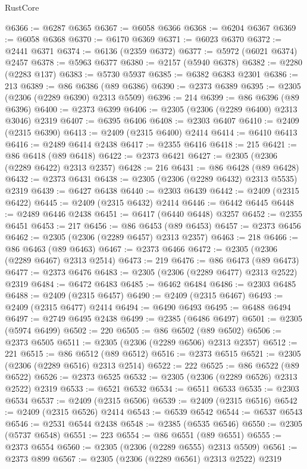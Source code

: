 \begin{lexlean}{RustCore}
\begin{coremodule}
@6366 := @6287 @6365
@6367 := @6058 @6366
@6368 := @6204 @6367
@6369 := @6058 @6368
@6370 := @6170 @6369
@6371 := @6023 @6370
@6372 := @2441 @6371
@6374 := @6136 (@2359 @6372)
@6377 := @5972 (@6021 @6374) @2457
@6378 := @5963 @6377
@6380 := @2157 (@5940 @6378)
@6382 := @2280 (@2283 @137)
@6383 := @5730 @5937
@6385 := @6382 @6383 @2301
@6386 := 213
@6389 := @86 @6386 (@89 @6386)
@6390 := @2373 @6389
@6395 := @2305 (@2306 (@2289 @6390) @2313 @5509)
@6396 := 214
@6399 := @86 @6396 (@89 @6396)
@6400 := @2373 @6399
@6406 := @2305 (@2306 (@2289 @6400) @2313 @3046) @2319
@6407 := @6395 @6406
@6408 := @2303 @6407
@6410 := @2409 (@2315 @6390)
@6413 := @2409 (@2315 @6400) @2414
@6414 := @6410 @6413
@6416 := @2489 @6414 @2438
@6417 := @2355 @6416
@6418 := 215
@6421 := @86 @6418 (@89 @6418)
@6422 := @2373 @6421
@6427 := @2305 (@2306 (@2289 @6422) @2313 @2357)
@6428 := 216
@6431 := @86 @6428 (@89 @6428)
@6432 := @2373 @6431
@6438 := @2305 (@2306 (@2289 @6432) @2313 @5535) @2319
@6439 := @6427 @6438
@6440 := @2303 @6439
@6442 := @2409 (@2315 @6422)
@6445 := @2409 (@2315 @6432) @2414
@6446 := @6442 @6445
@6448 := @2489 @6446 @2438
@6451 := @6417 (@6440 @6448) @3257
@6452 := @2355 @6451
@6453 := 217
@6456 := @86 @6453 (@89 @6453)
@6457 := @2373 @6456
@6462 := @2305 (@2306 (@2289 @6457) @2313 @2357)
@6463 := 218
@6466 := @86 @6463 (@89 @6463)
@6467 := @2373 @6466
@6472 := @2305 (@2306 (@2289 @6467) @2313 @2514)
@6473 := 219
@6476 := @86 @6473 (@89 @6473)
@6477 := @2373 @6476
@6483 := @2305 (@2306 (@2289 @6477) @2313 @2522) @2319
@6484 := @6472 @6483
@6485 := @6462 @6484
@6486 := @2303 @6485
@6488 := @2409 (@2315 @6457)
@6490 := @2409 (@2315 @6467)
@6493 := @2409 (@2315 @6477) @2414
@6494 := @6490 @6493
@6495 := @6488 @6494
@6497 := @2749 @6495 @2438
@6499 := @2385 (@6486 @6497)
@6501 := @2305 (@5974 @6499)
@6502 := 220
@6505 := @86 @6502 (@89 @6502)
@6506 := @2373 @6505
@6511 := @2305 (@2306 (@2289 @6506) @2313 @2357)
@6512 := 221
@6515 := @86 @6512 (@89 @6512)
@6516 := @2373 @6515
@6521 := @2305 (@2306 (@2289 @6516) @2313 @2514)
@6522 := 222
@6525 := @86 @6522 (@89 @6522)
@6526 := @2373 @6525
@6532 := @2305 (@2306 (@2289 @6526) @2313 @2522) @2319
@6533 := @6521 @6532
@6534 := @6511 @6533
@6535 := @2303 @6534
@6537 := @2409 (@2315 @6506)
@6539 := @2409 (@2315 @6516)
@6542 := @2409 (@2315 @6526) @2414
@6543 := @6539 @6542
@6544 := @6537 @6543
@6546 := @2531 @6544 @2438
@6548 := @2385 (@6535 @6546)
@6550 := @2305 (@5737 @6548)
@6551 := 223
@6554 := @86 @6551 (@89 @6551)
@6555 := @2373 @6554
@6560 := @2305 (@2306 (@2289 @6555) @2313 @5509)
@6561 := @2373 @899
@6567 := @2305 (@2306 (@2289 @6561) @2313 @2522) @2319

\end{coremodule}
\end{lexlean}
